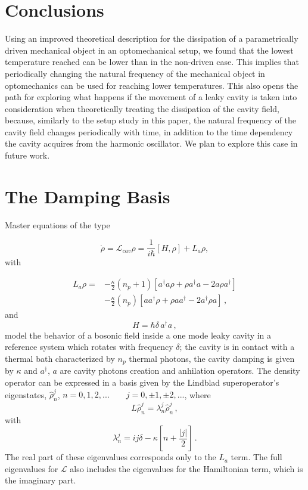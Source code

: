 \documentclass[reprint, amsmath,amssymb, aps,pra]{revtex4-1}
\begin{document}
\section{Conclusions}\label{ConCl}

Using an improved theoretical description for the dissipation of a
parametrically driven mechanical object in an optomechanical setup, we
found that the lowest temperature reached can be lower than in the
non-driven case. This implies that periodically changing the natural
frequency of the mechanical object in optomechanics can be used for
reaching lower temperatures. This also opens the path for exploring
what happens if the movement of a leaky cavity is taken into
consideration when theoretically treating the dissipation of the
cavity field, because, similarly to the setup study in this paper, the
natural frequency of the cavity field changes periodically with time,
in addition to the time dependency the cavity acquires from the
harmonic oscillator. We plan to explore this case in future work.
 
\appendix
\section{The Damping Basis}\label{App1}

Master equations of the type 

\begin{equation}
\dot{\rho} = \mathcal{L}_{cav} \rho = \frac{1}{i\hbar}[H,\rho]+L_a\rho, 
\end{equation} with

\begin{align}\label{EMField}
L_a \rho =& - \frac{\kappa}{2}(n_p+1)[a^\dagger a\rho + \rho a^\dagger a -2a\rho a^\dagger] \nonumber \\
 &- \frac{\kappa}{2}(n_p)[ aa^\dagger\rho + \rho  aa^\dagger -2a^\dagger\rho a]\, ,
\end{align}
and
\begin{equation}
  H=\hbar \delta \, a^\dagger a\, ,
\end{equation}
model the behavior of a bosonic field inside a one mode leaky cavity
in a reference system which rotates with frequency $\delta$; the cavity is in contact with a thermal bath
characterized by $n_p$ thermal photons, the
cavity damping is given by $\kappa$ \cite{EnglertDB} and $a^\dagger$,
$a$ are cavity photons creation and anhilation operators. The density
operator can be expressed in a basis given by the Lindblad
superoperator's eigenstates, ${\hat{\rho}_n^j}$,
$n=0,1,2,...\qquad j = 0,\pm 1, \pm 2,... $, where
\begin{equation}
L\hat{\rho}_n^j = \lambda_n^j\hat{\rho}_n^j\label{eq:eigen_damping}\, ,
\end{equation}
with
\begin{equation}
\lambda_n^j = ij\delta -\kappa[n + \frac{|j|}{2}]\, .
\end{equation} The real part of these eigenvalues corresponds only to the $L_a$ term. The full eigenvalues for $\mathcal{L}$  also includes the eigenvalues for the Hamiltonian term, which is the imaginary part.
\end{document}
